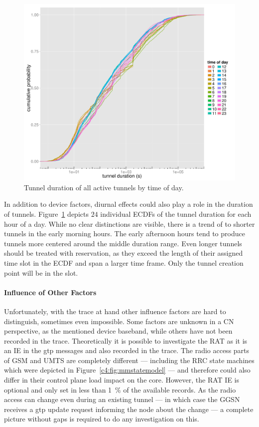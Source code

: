 \begin{figure}[htb]
  \centering
  \includegraphics[width=1.0\textwidth]{images/R-duration-timeofday-ecdf.pdf}
  \caption{Tunnel duration of all active tunnels by time of day.}
 \label{c4:fig:duration-timeofday-ecdf}
\end{figure}

In addition to device factors, diurnal effects could also play a role in the duration of tunnels. Figure~\ref{c4:fig:duration-timeofday-ecdf} depicts $24$ individual \glspl{ECDF} of the tunnel duration for each hour of a day. While no clear distinctions are visible, there is a trend of to shorter tunnels in the early morning hours. The early afternoon hours tend to produce tunnels more centered around the middle duration range. Even longer tunnels should be treated with reservation, as they exceed the length of their assigned time slot in the \gls{ECDF} and span a larger time frame. Only the tunnel creation point will be in the slot.


\paragraph{Influence of Other Factors}

Unfortunately, with the trace at hand other influence factors are hard to distinguish, sometimes even impossible. Some factors are unknown in a \gls{CN} perspective, as the mentioned device baseband, while others have not been recorded in the trace.
Theoretically it is possible to investigate the \gls{RAT} as it is an \gls{IE} in the \gls{gtp} messages and also recorded in the trace. The radio access parts of \gls{GSM} and \gls{UMTS} are completely different --- including the \gls{RRC} state machines which were depicted in Figure~\ref{c4:fig:mmstatemodel} --- and therefore could also differ in their control plane load impact on the core. However, the \gls{RAT} \gls{IE} is optional and only set in less than \SI{1}{\percent} of the available records. As the radio access can change even during an existing tunnel --- in which case the \gls{GGSN} receives a \gls{gtp} update request informing the node about the change --- a complete picture without gaps is required to do any investigation on this.



